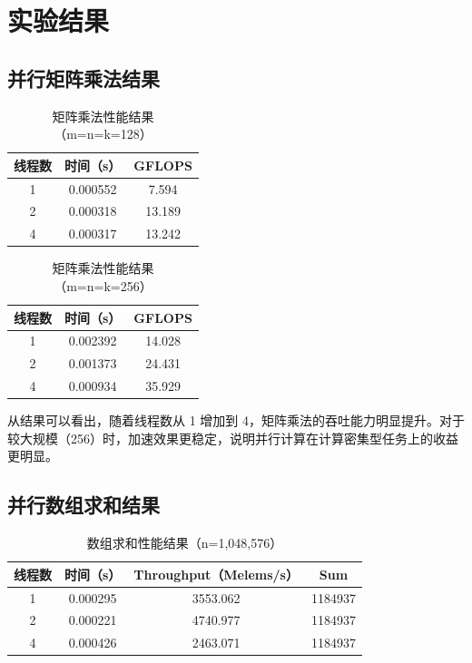 \documentclass[12pt,a4paper]{ctexart}
\begin{document}
\section{实验结果}
\subsection{并行矩阵乘法结果}
\begin{table}[h]
\centering
\caption{矩阵乘法性能结果（m=n=k=128）}
\begin{tabular}{ccc}
\toprule
线程数 & 时间（s） & GFLOPS \\
\midrule
1 & 0.000552 & 7.594 \\
2 & 0.000318 & 13.189 \\
4 & 0.000317 & 13.242 \\
\bottomrule
\end{tabular}
\end{table}

\begin{table}[h]
\centering
\caption{矩阵乘法性能结果（m=n=k=256）}
\begin{tabular}{ccc}
\toprule
线程数 & 时间（s） & GFLOPS \\
\midrule
1 & 0.002392 & 14.028 \\
2 & 0.001373 & 24.431 \\
4 & 0.000934 & 35.929 \\
\bottomrule
\end{tabular}
\end{table}

从结果可以看出，随着线程数从 1 增加到 4，矩阵乘法的吞吐能力明显提升。对于较大规模（256）时，加速效果更稳定，说明并行计算在计算密集型任务上的收益更明显。

\subsection{并行数组求和结果}
\begin{table}[h]
\centering
\caption{数组求和性能结果（n=1,048,576）}
\begin{tabular}{cccc}
\toprule
线程数 & 时间（s） & Throughput（Melems/s） & Sum \\
\midrule
1 & 0.000295 & 3553.062 & 1184937 \\
2 & 0.000221 & 4740.977 & 1184937 \\
4 & 0.000426 & 2463.071 & 1184937 \\
\bottomrule
\end{tabular}
\end{table}
\end{document}
